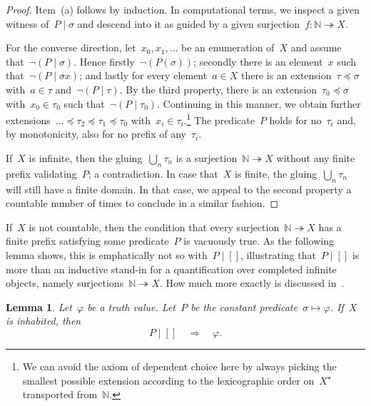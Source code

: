 \documentclass[com,11pt,crcready]{iosart2x}
\theoremstyle{definition}
\theoremstyle{plain}
\newtheorem{lemma}[definition]{Lemma}
\theoremstyle{remark}
\newcommand{\NN}{\mathbb{N}}
\renewcommand{\_}{\mathpunct{.}\,}
\begin{document}
\begin{proof}
Item~(a) follows by induction. In computational terms, we inspect a given
witness of~$P \mid \sigma$ and descend into it as guided by a given
surjection~$f : \NN \twoheadrightarrow X$.

For the converse direction, let~$x_0,x_1,\ldots$ be an enumeration of~$X$ and
assume that~$\neg(P \mid \sigma)$. Hence firstly~$\neg(P(\sigma))$; secondly there is an
element~$x$ such that~$\neg(P \mid \sigma x)$; and lastly for every element~$a
\in X$ there is an extension~$\tau \preceq \sigma$ with~$a \in \tau$
and~$\neg(P \mid \tau)$. By the third property,
there is an extension~$\tau_0 \preceq
\sigma$ with~$x_0 \in \tau_0$ such that~$\neg(P \mid \tau_0)$. Continuing in
this manner, we obtain further extensions~$\ldots \preceq \tau_2 \preceq \tau_1
\preceq \tau_0$ with~$x_i \in \tau_i$.\footnote{We can avoid the axiom of
dependent choice here by always picking the smallest possible extension
according to the lexicographic order on~$X^\star$ transported from~$\NN$.}
The predicate~$P$ holds for no~$\tau_i$ and, by monotonicity, also for no
prefix of any~$\tau_i$.

If~$X$ is infinite, then the gluing~$\bigcup_n \tau_n$ is a surjection~$\NN
\twoheadrightarrow X$ without any finite prefix validating~$P$; a
contradiction. In case that~$X$ is finite, the gluing~$\bigcup_n \tau_n$ will
still have a finite domain. In that case, we appeal to the second property a
countable number of times to conclude in a similar fashion.
\end{proof}

If~$X$ is not countable, then the condition that every surjection~$\NN
\twoheadrightarrow X$ has a finite prefix satisfying some predicate~$P$ is
vacuously true. As the following lemma shows, this is emphatically not so
with~$P \mid []$, illustrating that~$P \mid []$ is more than an inductive
stand-in for a quantification over completed infinite objects, namely
surjections~$\NN \twoheadrightarrow X$. How much more exactly is discussed
in~\cite{blechschmidt:multiverse}.

\begin{lemma}Let~$\varphi$ be a truth value. Let~$P$ be the constant
predicate~$\sigma \mapsto \varphi$. If~$X$ is inhabited, then
\[ P \mid [] \quad\Longrightarrow\quad \varphi. \]
\end{lemma}
\end{document}
